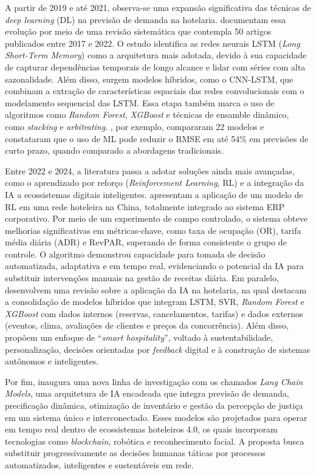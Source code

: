 A partir de 2019 e até 2021, observa-se uma expansão significativa das técnicas de \textit{deep learning} (DL) na previsão de demanda na hotelaria. \citet{dowlut2023forecasting} documentam essa evolução por meio de uma revisão sistemática que contempla 50 artigos publicados entre 2017 e 2022. O estudo identifica as redes neurais LSTM (\textit{Long Short-Term Memory}) como a arquitetura mais adotada, devido à sua capacidade de capturar dependências temporais de longo alcance e lidar com séries com alta sazonalidade. Além disso, surgem modelos híbridos, como o CNN-LSTM, que combinam a extração de características espaciais das redes convolucionais com o modelamento sequencial das LSTM. Essa etapa também marca o uso de algoritmos como \textit{Random Forest}, \textit{XGBoost} e técnicas de ensamble dinâmico, como \textit{stacking} e \textit{arbitrating}. \citet{Pereira02092022}, por exemplo, compararam 22 modelos e constataram que o uso de ML pode reduzir o RMSE em até 54\% em previsões de curto prazo, quando comparado a abordagens tradicionais.

Entre 2022 e 2024, a literatura passa a adotar soluções ainda mais avançadas, como o aprendizado por reforço (\textit{Reinforcement Learning}, RL) e a integração da IA a ecossistemas digitais inteligentes. \citet{Chen2023} apresentam a aplicação de um modelo de RL em uma rede hoteleira na China, totalmente integrado ao sistema ERP corporativo. Por meio de um experimento de campo controlado, o sistema obteve melhorias significativas em métricas-chave, como taxa de ocupação (OR), tarifa média diária (ADR) e RevPAR, superando de forma consistente o grupo de controle. O algoritmo demonstrou capacidade para tomada de decisão automatizada, adaptativa e em tempo real, evidenciando o potencial da IA para substituir intervenções manuais na gestão de receitas diária. Em paralelo, \citet{henriques2024hotel} desenvolvem uma revisão sobre a aplicação da IA na hotelaria, na qual destacam a consolidação de modelos híbridos que integram LSTM, SVR, \textit{Random Forest} e \textit{XGBoost} com dados internos (reservas, cancelamentos, tarifas) e dados externos (eventos, clima, avaliações de clientes e preços da concorrência). Além disso, propõem um enfoque de “\textit{smart hospitality}”, voltado à sustentabilidade, personalização, decisões orientadas por \textit{feedback} digital e à construção de sistemas autônomos e inteligentes.

Por fim, \citet{mahaboobsubani2024} inaugura uma nova linha de investigação com os chamados \textit{Lang Chain Models}, uma arquitetura de IA encadeada que integra previsão de demanda, precificação dinâmica, otimização de inventário e gestão da percepção de justiça em um sistema único e interconectado. Esses modelos são projetados para operar em tempo real dentro de ecossistemas hoteleiros 4.0, os quais incorporam tecnologias como \textit{blockchain}, robótica e reconhecimento facial. A proposta busca substituir progressivamente as decisões humanas táticas por processos automatizados, inteligentes e sustentáveis em rede.

